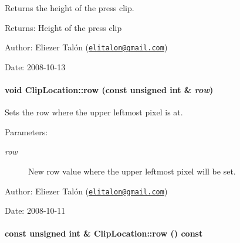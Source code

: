 Returns the height of the press clip. 

\begin{Desc}
\item[Returns:]Height of the press clip\end{Desc}
\begin{Desc}
\item[Author:]Eliezer Talón (\href{mailto:elitalon@gmail.com}{\tt elitalon@gmail.com}) \end{Desc}
\begin{Desc}
\item[Date:]2008-10-13 \end{Desc}
\hypertarget{class_clip_location_5a95f9fae24adf0b6d227714b9b69e2e}{
\paragraph[{row}]{\setlength{\rightskip}{0pt plus 5cm}void ClipLocation::row (const unsigned int \& {\em row})}\hfill}
\label{class_clip_location_5a95f9fae24adf0b6d227714b9b69e2e}


Sets the row where the upper leftmost pixel is at. 

\begin{Desc}
\item[Parameters:]
\begin{description}
\item[{\em row}]New row value where the upper leftmost pixel will be set.\end{description}
\end{Desc}
\begin{Desc}
\item[Author:]Eliezer Talón (\href{mailto:elitalon@gmail.com}{\tt elitalon@gmail.com}) \end{Desc}
\begin{Desc}
\item[Date:]2008-10-11 \end{Desc}
\hypertarget{class_clip_location_8816c925e80c2e55bbbbdd6da799f53f}{
\paragraph[{row}]{\setlength{\rightskip}{0pt plus 5cm}const unsigned int \& ClipLocation::row () const}\hfill}
\label{class_clip_location_8816c925e80c2e55bbbbdd6da799f53f}


